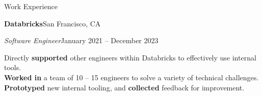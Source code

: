 













  \vspace{10pt}

  {\sectionfont Work Experience}

  \vspace{5pt}
  \textbf{Databricks}\quad{}\hfill San Francisco, CA
  \begin{adjustwidth}{10pt}{}
    \emph{Software Engineer}\hfill January 2021 -- December 2023


    Directly \textbf{supported} other engineers within Databricks to effectively use internal tools. \\
    \textbf{Worked in} a team of 10 -- 15 engineers to solve a variety of technical challenges. \\
    \textbf{Prototyped} new internal tooling, and \textbf{collected} feedback for improvement.
  \end{adjustwidth}


